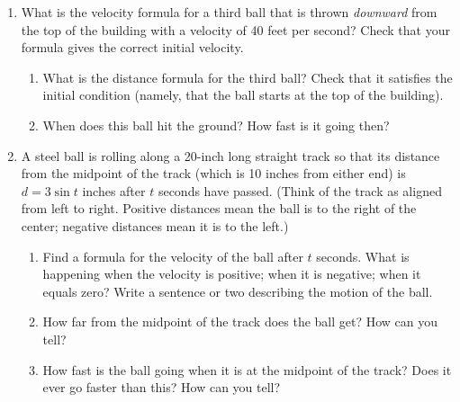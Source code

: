 \begin{enumerate}
\begin{enumerate}
  \item Use your graph to answer the following questions.  During what
period of time is the ball rising?  During what period of time is it
falling?  When does it reach the highest point of its flight?

  \item How high does the ball rise?



\end{enumerate}
\item What is the velocity formula for a third ball that is thrown
      {\em downward\/} from the top of the building with a velocity of
      40 feet per second?  Check that your formula gives the correct
      initial velocity.

  \begin{enumerate}
  \item What is the distance formula for the third ball?  Check that it
satisfies the initial condition (namely, that the ball starts at the
top of the building).

  \item When does this ball hit the ground?  How fast is it going then?



\end{enumerate}
\item A steel ball is rolling along a 20-inch long straight track so
that its distance from the midpoint of the track (which is 10 inches
from either end) is $d=3 \sin{t}$ inches after $t$ seconds have
passed.  (Think of the track as aligned from left to right.  Positive
distances mean the ball is to the right of the center; negative
distances mean it is to the left.)


  \begin{enumerate}
  \item Find a formula for the velocity of the ball after $t$ seconds.
What is happening when the velocity is positive; when it is negative;
when it equals zero?  Write a sentence or two describing the motion of
the ball.

  \item How far from the midpoint of the track does the ball get?  How
can you tell?

  \item How fast is the ball going when it is at the midpoint of the
track?  Does it ever go faster than this?  How can you tell?




\end{enumerate}
\end{enumerate}
